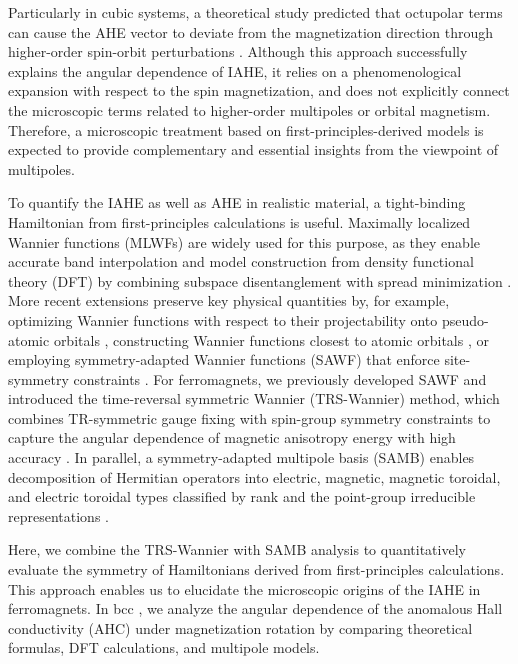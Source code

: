 \documentclass[preprint,12pt]{elsarticle}
\begin{document}
Particularly in cubic systems, a theoretical study predicted that
octupolar terms can cause the AHE vector to deviate from the
magnetization direction through higher-order spin-orbit perturbations
\cite{Liu2025-af}. Although this approach successfully explains the angular
dependence of IAHE, it relies on a phenomenological expansion with
respect to the spin magnetization, and does not explicitly connect
the microscopic terms related to higher-order multipoles or orbital
magnetism. Therefore, a microscopic treatment based on
first-principles-derived models is expected to provide complementary
and essential insights from the viewpoint of multipoles.

To quantify the IAHE as well as AHE in realistic material,
a tight-binding Hamiltonian from first-principles calculations is useful.
Maximally
localized Wannier functions (MLWFs) are widely used for this purpose,
as they enable accurate band interpolation and model construction
from density functional theory (DFT) by combining subspace disentanglement
\cite{Souza2001-hk} with spread minimization \cite{Marzari1997-rw}.
More recent extensions preserve key physical quantities
by, for example, optimizing Wannier functions with respect to their
projectability onto pseudo-atomic orbitals \cite{Qiao2023-mx},
constructing Wannier functions closest to atomic orbitals
\cite{Ozaki2024-ou, Oiwa2025-rm}, or employing symmetry-adapted
Wannier functions (SAWF) that enforce site-symmetry constraints
\cite{Sakuma2013-rq, Koretsune2023-ev}.
For ferromagnets, we previously developed SAWF and introduced the time-reversal
symmetric Wannier (TRS-Wannier) method, which
combines TR-symmetric gauge fixing with spin-group symmetry
constraints to capture the angular dependence of magnetic anisotropy
energy with high accuracy \cite{Saito2024-vw}.
In parallel, a symmetry-adapted multipole basis (SAMB) enables
decomposition of Hermitian operators into electric, magnetic,
magnetic toroidal, and electric toroidal types classified by rank and
the point-group irreducible representations \cite{Kusunose2023-fe,
Inda2024-oz, Hayami2024-ab, Oiwa2025-rm, Oiwa2025-td}.

Here, we combine the TRS-Wannier with SAMB analysis to
quantitatively evaluate the symmetry of Hamiltonians derived from
first-principles calculations.
This approach enables us to elucidate the microscopic origins of the
IAHE in ferromagnets.
In bcc , we analyze the angular dependence of the anomalous
Hall conductivity (AHC) under magnetization rotation by comparing
theoretical formulas,
DFT calculations, and multipole models.
\end{document}
